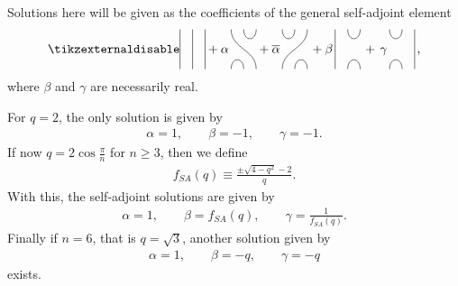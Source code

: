 Solutions here will be given as the coefficients of the general self-adjoint element
\begin{align*}\tikzexternaldisable
\begin{tikzpicture}[scale = 0.7, baseline=-1mm]
		\foreach \x in {-0.5,0,0.5}
			\draw (\x, 0.8) -- (\x,-0.8);
	\end{tikzpicture}
	+ \alpha\,
		\begin{tikzpicture}[scale = 0.7, baseline=-1mm]
			\draw (0,0.8) .. controls (0,-0.5+0.8) and (0.5,-0.5+0.8) .. (0.5,0.8);
			\draw (-0.5,-0.8) .. controls (-0.5,1-0.5-0.8) and (0,1-0.5-0.8) .. (0,-0.8);
			\draw (-0.5,0.8) .. controls (-0.5,0) and (0.5,0) .. (0.5, -0.8);
		\end{tikzpicture}
	+\overline{\alpha}\,
		\begin{tikzpicture}[scale = 0.7, baseline=-1mm]
			\draw (-0.5,0.8) .. controls (-0.5,-0.5+0.8) and (0,-0.5+0.8) .. (0,0.8);
			\draw (-0,-0.8) .. controls (-0,1-0.5-0.8) and (0.5,1-0.5-0.8) .. (0.5,-0.8);
			\draw (-0.5,-0.8) .. controls (-0.5,0) and (0.5,0) .. (0.5, 0.8);
		\end{tikzpicture}\,
+\beta\,
	\begin{tikzpicture}[scale = 0.7, baseline=-1mm]
		\draw (-0.5,0.8) -- (-0.5,-0.8);
		\draw (0,0.8) .. controls (0,-0.5+0.8) and (0.5,-0.5+0.8) .. (0.5,0.8);
		\draw (-0,-0.8) .. controls (-0,1-0.5-0.8) and (0.5,1-0.5-0.8) .. (0.5,-0.8);
	\end{tikzpicture}
	\,+ \,\gamma\,
	\begin{tikzpicture}[scale = 0.7, baseline=-1mm]
		\draw (0.5,0.8) -- (0.5,-0.8);
		\draw (-0.5,0.8) .. controls (-0.5,-0.5+0.8) and (0,-0.5+0.8) .. (0,0.8);
		\draw (-0.5,-0.8) .. controls (-0.5,1-0.5-0.8) and (0,1-0.5-0.8) .. (0,-0.8);
	\end{tikzpicture}\,,
\end{align*}
where $\beta$ and $\gamma$ are necessarily real.

For $q=2$, the only solution is given by
\begin{align*}
\alpha = 1,\qquad
\beta= -1,\qquad
\gamma = -1.
\end{align*}
If now $q=2\cos\frac{\pi}{n}$ for $n\geq 3$, then we define
\begin{align*}
f_{SA}(q) \equiv \frac{\pm \sqrt{4 - q^2} - 2}{q}.
\end{align*}
With this, the self-adjoint solutions are given by
\begin{align*}
\alpha = 1,\qquad
\beta= f_{SA}(q),\qquad
\gamma = \frac{1}{f_{SA}(q)}.
\end{align*}
Finally if $n=6$, that is $q=\sqrt{3}$, another solution given by
\begin{align*}
\alpha = 1,\qquad
\beta= -q,\qquad
\gamma = -q
\end{align*}
exists.

